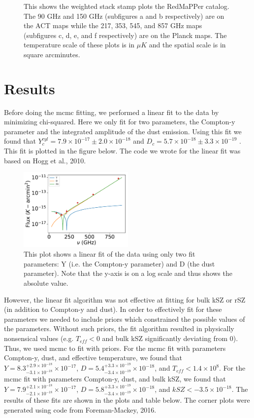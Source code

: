 \documentclass{princeton_astro_thesis}
\begin{document}
\begin{figure}[ht]
\begin{subfigure}[b]{0.1\linewidth}
    \caption{\label{fig:fig3}}
  \end{subfigure}
  \caption{This shows the weighted stack stamp plots the RedMaPPer catalog. The 90 GHz and 150 GHz (subfigures a and b respectively) are on the ACT maps while the 217, 353, 545, and 857 GHz maps (subfigures c, d, e, and f respectively) are on the Planck maps. The temperature scale of these plots is in $\mu K$ and the spatial scale is in square arcminutes.}
\end{figure}
\chapter{Results}
Before doing the mcmc fitting, we performed a linear fit to the data by minimizing chi-squared. Here we only fit for two parameters, the Compton-y parameter and the integrated amplitude of the dust emission. Using this fit we found that $Y^{cyl}_{c}=7.9\times10^{-17}\pm 2.0\times10^{-18}$ and $D_c=5.7\times10^{-18}\pm 3.3\times10^{-19}$ . This fit is plotted in the figure below. The code we wrote for the linear fit was based on Hogg et al., 2010.

\begin{figure}[h]
\centering
\includegraphics[width=0.5\textwidth]{../redmapper_apfluxes_fitlog.pdf}
\caption{This plot shows a linear fit of the data using only two fit parameters: Y (i.e. the Compton-y parameter) and D (the dust parameter). Note that the y-axis is on a log scale and thus shows the absolute value.}
\end{figure}

\par However, the linear fit algorithm was not effective at fitting for bulk kSZ or rSZ (in addition to Compton-y and dust). In order to effectively fit for these parameters we needed to include priors which constrained the possible values of the parameters. Without such priors, the fit algorithm resulted in physically nonsensical values (e.g. $T_{eff}<0$ and bulk kSZ significantly deviating from 0). Thus, we used mcmc to fit with priors. For the mcmc fit with parameters Compton-y, dust, and effective temperature, we found that $Y=8.3^{+2.9\times10^{-18}}_{-3.1\times10^{-18}}\times10^{-17}$, $D=5.4^{+3.3\times10^{-19}}_{-3.4\times10^{-19}}\times10^{-18}$, and $T_{eff}<1.4\times10^8$. For the mcmc fit with parameters Compton-y, dust, and bulk kSZ, we found that $Y=7.9^{+2.1\times10^{-18}}_{-2.1\times10^{-18}}\times10^{-17}$, $D=5.8^{+3.3\times10^{-19}}_{-3.4\times10^{-19}}\times10^{-18}$, and $kSZ<-3.5\times10^{-18}$. The results of these fits are shown in the plots and table below. The corner plots were generated using code from Foreman-Mackey, 2016. 
\end{document}
